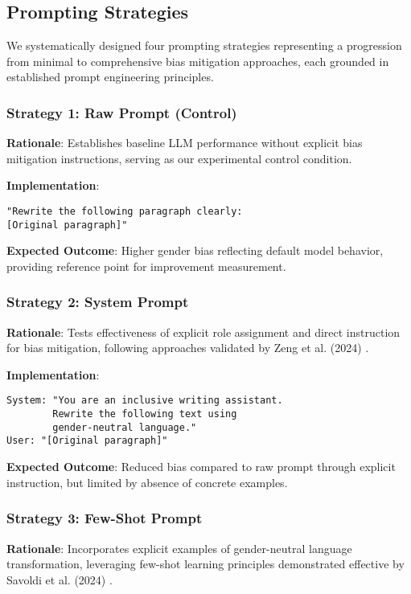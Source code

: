 \subsection{Prompting Strategies}

We systematically designed four prompting strategies representing a progression from minimal to comprehensive bias mitigation approaches, each grounded in established prompt engineering principles.

\subsubsection{Strategy 1: Raw Prompt (Control)}
\textbf{Rationale}: Establishes baseline LLM performance without explicit bias mitigation instructions, serving as our experimental control condition.

\textbf{Implementation}: 
\begin{verbatim}
"Rewrite the following paragraph clearly:
[Original paragraph]"
\end{verbatim}

\textbf{Expected Outcome}: Higher gender bias reflecting default model behavior, providing reference point for improvement measurement.

\subsubsection{Strategy 2: System Prompt}
\textbf{Rationale}: Tests effectiveness of explicit role assignment and direct instruction for bias mitigation, following approaches validated by Zeng et al. (2024) \cite{zeng2024debiasprompting}.

\textbf{Implementation}:
\begin{verbatim}
System: "You are an inclusive writing assistant. 
        Rewrite the following text using 
        gender-neutral language."
User: "[Original paragraph]"
\end{verbatim}

\textbf{Expected Outcome}: Reduced bias compared to raw prompt through explicit instruction, but limited by absence of concrete examples.

\subsubsection{Strategy 3: Few-Shot Prompt}
\textbf{Rationale}: Incorporates explicit examples of gender-neutral language transformation, leveraging few-shot learning principles demonstrated effective by Savoldi et al. (2024) \cite{savoldi2024neutraltranslation}.

